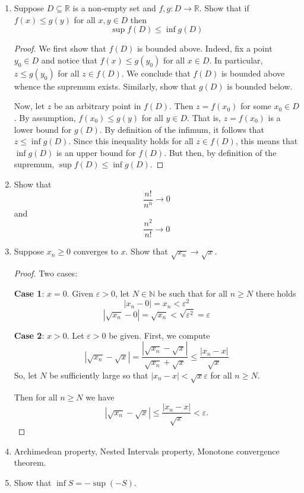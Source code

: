 \documentclass[12pt, reqno]{article}
\numberwithin{equation}{section}
\theoremstyle{definition}
\theoremstyle{remark}
\newcommand{\NN}{\mathbb{N}}
\newcommand{\RR}{\mathbb{R}}
\newcommand{\abs}[1]{\left\lvert#1\right\rvert}
\renewcommand{\epsilon}{\varepsilon}
\begin{document}
\begin{enumerate}[leftmargin=*]
	\item Suppose $D\subseteq \RR$ is a non-empty set and $f, g : D \to \RR$. Show that if $f(x) \leq g(y)$ for all $x, y\in D$ then
	      \[
		      \sup f(D) \leq \inf g(D)
	      \]
	      \begin{proof}
		      We first show that $f(D)$ is bounded above. Indeed, fix a point $y_0\in D$ and notice that $f(x) \leq g(y_0)$ for all $x\in D$. In particular, $z\leq g(y_0)$ for all $z\in f(D)$. We conclude that $f(D)$ is bounded above whence the supremum exists.
		      Similarly, show that $g(D)$ is bounded below.

		      Now, let $z$ be an arbitrary point in $f(D)$. Then $z = f(x_0)$ for some $x_0 \in D$. By assumption, $f(x_0) \leq g(y)$ for all $y\in D$. That is, $z = f(x_0)$ is a lower bound for $g(D)$. By definition of the infimum, it follows that $z \leq \inf g(D)$. Since this inequality holds for all $z\in f(D)$, this means that $\inf g(D)$ is an upper bound for $f(D)$. But then, by definition of the supremum, $\sup f(D) \leq \inf g(D)$.
	      \end{proof}

	\item Show that
	      \[
		      \frac{n!}{n^n} \to 0
	      \]
	      and
	      \[
		      \frac{n^2}{n!} \to 0
	      \]

	\item Suppose $x_n \geq 0$ converges to $x$. Show that $\sqrt{x_n} \to \sqrt{x}$.

	      \begin{proof} Two cases:

		      \textbf{Case 1}: $x = 0$. Given $\epsilon > 0$, let $N \in \NN$ be such that for all $n\geq N$ there holds
		      \[
			      \abs{x_n - 0} = x_n < \epsilon^2
		      \]
		      \[
			      \abs{\sqrt{x_n} -0} = \sqrt{x_n} < \sqrt{\epsilon^2} = \epsilon
		      \]

		      \textbf{Case 2}: $x>0$. Let $\epsilon > 0$ be given. First, we compute
		      \[
			      \abs{\sqrt{x_n} - \sqrt{x}}
			      =\frac{\abs{\sqrt{x_n} - \sqrt{x}}}{\sqrt{x_n} + \sqrt{x}}
			      \leq \frac{\abs{{x_n} - {x}}}{\sqrt{x}}
		      \]
		      So, let $N$ be sufficiently large so that $\abs{x_n - x} < \sqrt{x}\epsilon$ for all $n\geq N$.

		      Then for all $n\geq N$ we have
		      \[
			      \abs{\sqrt{x_n} - \sqrt{x}} \leq \frac{\abs{{x_n} - {x}}}{\sqrt{x}} < \epsilon.
		      \]
	      \end{proof}

	\item Archimedean property, Nested Intervals property, Monotone convergence theorem.

	\item Show that $\inf S = -\sup(-S)$.

\end{enumerate}
\end{document}
